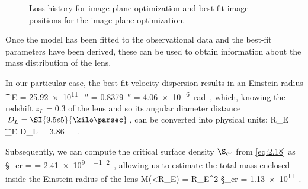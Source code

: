 \begin{figure}
  \begin{minipage}{0.49\linewidth}
    \centering
  \end{minipage}
  \begin{minipage}{0.49\linewidth}
    \centering
  \end{minipage}
  \caption[Best-fit model loss history and image positions for image plane optimization]{\protect{} Loss history for image plane optimization and \protect{} best-fit image positions for the image plane optimization.}
  \label{fig:loss_best_image_plane}
\end{figure}

Once the model has been fitted to the observational data and the best-fit parameters have been derived, these can be used to obtain information about the mass distribution of the lens.

In our particular case, the best-fit velocity dispersion results in an Einstein radius
\be
\label{eq:best_er}
\t_E = \SI{25.92e11}{}  \SI{}{\arcsecond} = \SI{0.8379}{\arcsecond} = \SI{4.06e-6}{\radian} \,,
\ee
which, knowing the redshift $z_L = 0.3$ of the lens and so its angular diameter distance $D_L = \SI{9.5e5}{\kilo\parsec}$, can be converted into physical units:
\be
\label{eq:best_er_kpc}
R_E = \t_E D_L = \SI{3.86}{\kilo\parsec} \,.
\ee

Subsequently, we can compute the critical surface density $\S_{cr}$ from \cref{eq:2.18} as
\be
\label{eq:surfcrit}
\S_{cr} =   = \SI{2.41e9}{\msun\per\kilo\parsec\squared} \,,
\ee
allowing us to estimate the total mass enclosed inside the Einstein radius of the lens
\be
\label{eq:mass_er}
M(<R_E) = \pi R_E^2 \S_{cr} = \SI{1.13e11}{\msun} \,.
\ee